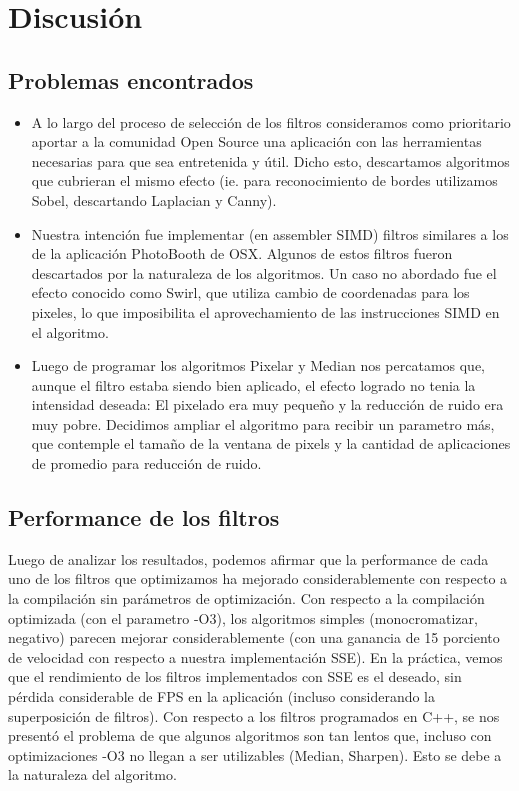 \section{Discusi\'on}

\subsection{Problemas encontrados}
\begin{itemize}

\item A lo largo del proceso de selecci\'on de los filtros consideramos como prioritario aportar a la comunidad Open Source una aplicaci\'on con las herramientas necesarias para que sea entretenida y \'util. Dicho esto, descartamos algoritmos que cubrieran el mismo efecto (ie. para reconocimiento de bordes utilizamos Sobel, descartando Laplacian y Canny).
\item Nuestra intenci\'on fue implementar (en assembler SIMD) filtros similares a los de la aplicaci\'on PhotoBooth de OSX. Algunos de estos filtros fueron descartados por la naturaleza de los algoritmos. Un caso no abordado fue el efecto conocido como Swirl, que utiliza cambio de coordenadas para los pixeles, lo que imposibilita el aprovechamiento de las instrucciones SIMD en el algoritmo.
\item Luego de programar los algoritmos Pixelar y Median nos percatamos que, aunque el filtro estaba siendo bien aplicado, el efecto logrado no tenia la intensidad deseada: El pixelado era muy peque\~no y la reducci\'on de ruido era muy pobre. Decidimos ampliar el algoritmo para recibir un parametro m\'as, que contemple el tama\~no de la ventana de pixels y la cantidad de aplicaciones de promedio para reducci\'on de ruido.


\end{itemize}

\subsection{Performance de los filtros}
Luego de analizar los resultados, podemos afirmar que la performance de cada uno de los filtros que optimizamos ha mejorado considerablemente con respecto a la compilaci\'on sin par\'ametros de optimizaci\'on. Con respecto a la compilaci\'on optimizada (con el parametro -O3), los algoritmos simples (monocromatizar, negativo) parecen mejorar considerablemente (con una ganancia de 15 porciento de velocidad con respecto a nuestra implementaci\'on SSE). En la pr\'actica, vemos que el rendimiento de los filtros implementados con SSE es el deseado, sin p\'erdida considerable de FPS en la aplicaci\'on (incluso considerando la superposici\'on de filtros). Con respecto a los filtros programados en C++, se nos present\'o el problema de que algunos algoritmos son tan lentos que, incluso con optimizaciones -O3 no llegan a ser utilizables (Median, Sharpen). Esto se debe a la naturaleza del algoritmo.

